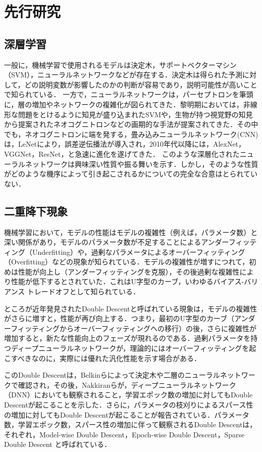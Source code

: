 \chapter{先行研究}
\section{深層学習}
一般に，機械学習で使用されるモデルは決定木，サポートベクターマシン（SVM），ニューラルネットワークなどが存在する．決定木は得られた予測に対して，どの説明変数が影響したのかの判断が容易であり，説明可能性が高いことで知られている．
一方で，ニューラルネットワークは，パーセプトロンを筆頭に，層の増加やネットワークの複雑化が図られてきた．黎明期においては，非線形な問題をとけるように知見が盛り込まれたSVMや，生物が持つ視覚野の知見から提案されたネオコグニトロンなどの画期的な手法が提案されてきた．その中でも，ネオコグニトロンに端を発する，畳み込みニューラルネットワーク(CNN)は，LeNet\cite{LeNet}により，誤差逆伝播法が導入され，2010年代以降には，AlexNet\cite{AlexNet}，VGGNet\cite{VGGNet}，ResNet\cite{ResNet}，と急速に進化を遂げてきた．
このような深層化されたニューラルネットワークは興味深い性質や振る舞いを示す．しかし，そのような性質がどのような機序によって引き起こされるかについての完全な合意はとられていない．

\newpage

\section{二重降下現象}
機械学習において，モデルの性能はモデルの複雑性（例えば，パラメータ数）と深い関係があり，モデルのパラメータ数が不足することによるアンダーフィッティング（Underfitting）\cite{underfitting}や，過剰なパラメータによるオーバーフィッティング（Overfitting）\cite{overfitting}などの現象が知られている．モデルの複雑性が増すにつれて，初めは性能が向上し（アンダーフィッティングを克服），その後過剰な複雑性により性能が低下するとされていた．これはU字型のカーブ，いわゆるバイアス-バリアンス トレードオフ\cite{Rajnarayan2010}として知られている．

ところが近年発見されたDouble Descent\cite{Belkin_2019}と呼ばれている現象は，モデルの複雑性がさらに増すと，性能が再び向上する．つまり，最初のU字型のカーブ（アンダーフィッティングからオーバーフィッティングへの移行）の後，さらに複雑性が増加すると，新たな性能向上のフェーズが現れるのである．過剰パラメータを持つディープニューラルネットワークが，理論的にはオーバーフィッティングを起こすべきなのに，実際には優れた汎化性能を示す場合がある\cite{ResNet,ViT}．

このDouble Descentは，Belkinら\cite{Belkin_2019}によって決定木や二層のニューラルネットワークで確認され，その後，Nakkiranら\cite{nakkiran2021deep}が，ディープニューラルネットワーク（DNN）においても観察されること，学習エポック数の増加に対してもDouble Descentが起こることを示した．さらに，パラメータの枝刈りによるスパース性の増加に対してもDouble Descentが起こることが報告されている\cite{He}．パラメータ数，学習エポック数，スパース性の増加に伴って観察されるDouble Descentは，それぞれ，Model-wise Double Descent，Epoch-wise Double Descent，Sparse Double Descent と呼ばれている\cite{nakkiran2021deep,He}．


